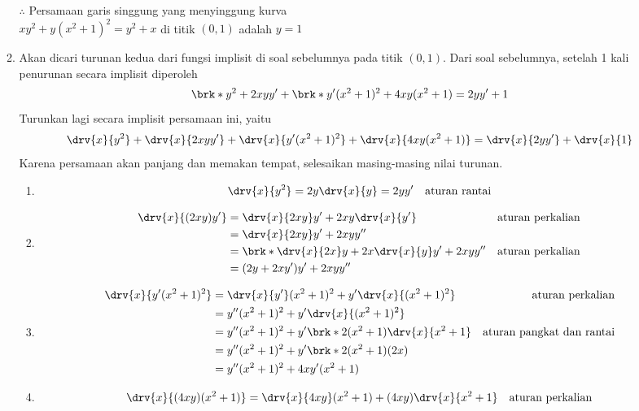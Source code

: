 \begin{enumerate}[leftmargin=*, label={\arabic*}.]
\begin{enumerate}[label={\alph*}.]
    $\therefore$ Persamaan garis singgung yang menyinggung kurva \\
    $xy^{2}+y(x^{2}+1)^{2} = y^{2}+x$ di titik $(0,1)$ adalah $y=1$
    \item Akan dicari turunan kedua dari fungsi implisit di soal sebelumnya 
    pada titik $(0,1)$. Dari soal sebelumnya, setelah 1 kali penurunan secara 
    implisit diperoleh
    \[
        \brk*{y^{2} + 2xyy'} + \brk*{y'(x^{2}+1)^{2} 
        + 4xy(x^{2}+1)}= 2yy' + 1
    \]
    Turunkan lagi secara implisit persamaan ini, yaitu
    \[
        \drv{x}{y^{2}}+\drv{x}{2xyy'}+\drv{x}{y'(x^{2}+1)^{2}}+\drv{x}{4xy(x^{2}+1)}
        =\drv{x}{2yy'}+\drv{x}{1}
    \]
    Karena persamaan akan panjang dan memakan tempat, selesaikan masing-masing nilai 
    turunan.
    \begin{enumerate}[label={\arabic*})]
        \item 
        \[
            \drv{x}{y^{2}} = 2y\drv{x}{y} = 2yy' \quad \text{aturan rantai}
        \]
        \item 
        \begin{align*}
            \drv{x}{(2xy)y'} 
            &= \drv{x}{2xy}y' + 2xy\drv{x}{y'}
            &\text{aturan perkalian}\\
            &= \drv{x}{2xy}y' + 2xyy''\\
            &= \brk*{\drv{x}{2x}y + 2x\drv{x}{y}}y' + 2xyy''
            &\text{aturan perkalian}\\
            &=(2y+2xy')y'+2xyy''
        \end{align*}
        \item 
        \begin{align*}
            \drv{x}{y'(x^{2}+1)^{2}} 
            &= \drv{x}{y'}(x^{2}+1)^{2}+y'\drv{x}{(x^{2}+1)^{2}}
            &\text{aturan perkalian}\\
            &= y''(x^{2}+1)^{2} + y'\drv{x}{(x^{2}+1)^{2}}\\
            &=y''(x^{2}+1)^{2} + y'\brk*{2(x^{2}+1)\drv{x}{x^{2}+1}}
            &\text{aturan pangkat dan rantai}\\
            &=y''(x^{2}+1)^{2} + y'\brk*{2(x^{2}+1)(2x)}\\
            &=y''(x^{2}+1)^{2} + 4xy'(x^{2}+1)
        \end{align*}
        \item 
        \begin{align*}
            \drv{x}{(4xy)(x^{2}+1)}
            &=\drv{x}{4xy}(x^{2}+1) + (4xy)\drv{x}{x^{2}+1}
            &\text{aturan perkalian}\\

\end{align*}
\end{enumerate}
\end{enumerate}
\end{enumerate}

